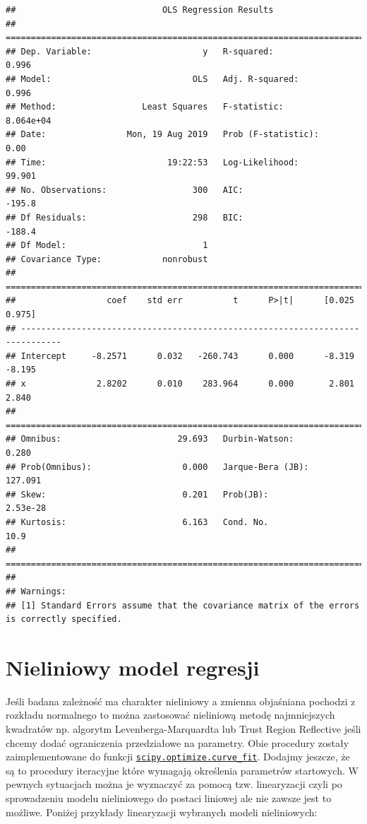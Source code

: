 \documentclass[polish,]{book}
\begin{document}
\begin{verbatim}
##                             OLS Regression Results                            
## ==============================================================================
## Dep. Variable:                      y   R-squared:                       0.996
## Model:                            OLS   Adj. R-squared:                  0.996
## Method:                 Least Squares   F-statistic:                 8.064e+04
## Date:                Mon, 19 Aug 2019   Prob (F-statistic):               0.00
## Time:                        19:22:53   Log-Likelihood:                 99.901
## No. Observations:                 300   AIC:                            -195.8
## Df Residuals:                     298   BIC:                            -188.4
## Df Model:                           1                                         
## Covariance Type:            nonrobust                                         
## ==============================================================================
##                  coef    std err          t      P>|t|      [0.025      0.975]
## ------------------------------------------------------------------------------
## Intercept     -8.2571      0.032   -260.743      0.000      -8.319      -8.195
## x              2.8202      0.010    283.964      0.000       2.801       2.840
## ==============================================================================
## Omnibus:                       29.693   Durbin-Watson:                   0.280
## Prob(Omnibus):                  0.000   Jarque-Bera (JB):              127.091
## Skew:                           0.201   Prob(JB):                     2.53e-28
## Kurtosis:                       6.163   Cond. No.                         10.9
## ==============================================================================
## 
## Warnings:
## [1] Standard Errors assume that the covariance matrix of the errors is correctly specified.
\end{verbatim}

\hypertarget{R23}{%
\section{Nieliniowy model regresji}\label{R23}}

Jeśli badana zależność ma charakter nieliniowy a zmienna objaśniana pochodzi z rozkładu normalnego to można zastosować nieliniową metodę najmniejszych kwadratów np. algorytm Levenberga-Marquardta lub Trust Region Reflective jeśli chcemy dodać ograniczenia przedziałowe na parametry. Obie procedury zostały zaimplementowane do funkcji
\href{https://docs.scipy.org/doc/scipy/reference/generated/scipy.optimize.curve_fit.html}{\texttt{scipy.optimize.curve\_fit}}. Dodajmy jeszcze, że są to procedury iteracyjne które wymagają określenia parametrów startowych. W pewnych sytuacjach można je wyznaczyć za pomocą tzw. linearyzacji czyli po sprowadzeniu modelu nieliniowego do postaci liniowej ale nie zawsze jest to możliwe. Poniżej przykłady linearyzacji wybranych modeli nieliniowych:
\end{document}

